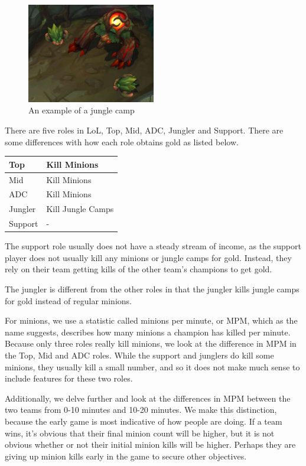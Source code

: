 \documentclass[runningheads]{llncs}
\begin{document}
	\begin{figure}
		\centering
		\includegraphics[width=0.5\textwidth]{images/jungle.jpg}
		\caption{An example of a jungle camp}
	\end{figure}

	There are five roles in LoL, Top, Mid, ADC, Jungler and Support. There are some differences with how each role obtains gold as listed below. 
	
	\begin{center}
		\begin{tabular}{ | L{2cm} | L{3cm} | }
			\hline
			Top & Kill Minions \\ \hline
			Mid & Kill Minions \\ \hline
			ADC & Kill Minions \\ \hline
			Jungler & Kill Jungle Camps \\ \hline
			Support & - \\ \hline						
		\end{tabular}
	\end{center}
	
	The support role usually does not have a steady stream of income, as the support player does not usually kill any minions or jungle camps for gold. Instead, they rely on their team getting kills of the other team’s champions to get gold. 

	The jungler is different from the other roles in that the jungler kills jungle camps for gold instead of regular minions. 

	For minions, we use a statistic called minions per minute, or MPM, which as the name suggests, describes how many minions a champion has killed per minute. Because only three roles really kill minions, we look at the difference in MPM in the Top, Mid and ADC roles. While the support and junglers do kill some minions, they usually kill a small number, and so it does not make much sense to include features for these two roles.

	Additionally, we delve further and look at the differences in MPM between the two teams from 0-10 minutes and 10-20 minutes. We make this distinction, because the early game is most indicative of how people are doing. If a team wins, it’s obvious that their final minion count will be higher, but it is not obvious whether or not their initial minion kills will be higher. Perhaps they are giving up minion kills early in the game to secure other objectives.
\end{document}
